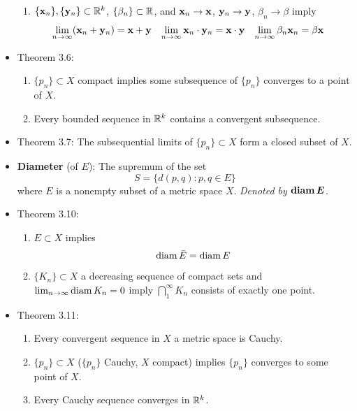 \documentclass[../../notes.tex]{subfiles}
\begin{document}
\begin{itemize}
\begin{enumerate}[label={(\alph*)}]
        \item $\{\mathbf{x}_n\},\{\mathbf{y}_n\}\subset\mathbb{R}^k$, $\{\beta_n\}\subset\mathbb{R}$, and $\mathbf{x}_n\to\mathbf{x}$, $\mathbf{y}_n\to\mathbf{y}$, $\beta_n\to\beta$ imply
        \begin{align*}
            \lim_{n\to\infty}(\mathbf{x}_n+\mathbf{y}_n) &= \mathbf{x}+\mathbf{y}&
            \lim_{n\to\infty}\mathbf{x}_n\cdot\mathbf{y}_n &= \mathbf{x}\cdot\mathbf{y}&
            \lim_{n\to\infty}\beta_n\mathbf{x}_n &= \beta\mathbf{x}
        \end{align*}
    \end{enumerate}
    \item Theorem 3.6:
    \begin{enumerate}[label={(\alph*)}]
        \item $\{p_n\}\subset X$ compact implies some subsequence of $\{p_n\}$ converges to a point of $X$.
        \item Every bounded sequence in $\mathbb{R}^k$ contains a convergent subsequence.
    \end{enumerate}
    \item Theorem 3.7: The subsequential limits of $\{p_n\}\subset X$ form a closed subset of $X$.
    \item \textbf{Diameter} (of $E$): The supremum of the set
    \begin{equation*}
        S = \{d(p,q):p,q\in E\}
    \end{equation*}
    where $E$ is a nonempty subset of a metric space $X$. \emph{Denoted by} $\bm{\diam E}$.
    \item Theorem 3.10:
    \begin{enumerate}[label={(\alph*)}]
        \item $E\subset X$ implies
        \begin{equation*}
            \operatorname{diam}\bar{E} = \operatorname{diam} E
        \end{equation*}
        \item $\{K_n\}\subset X$ a decreasing sequence of compact sets and $\lim_{n\to\infty}\operatorname{diam} K_n=0$ imply $\bigcap_1^\infty K_n$ consists of exactly one point.
    \end{enumerate}
    \item Theorem 3.11:
    \begin{enumerate}[label={(\alph*)}]
        \item Every convergent sequence in $X$ a metric space is Cauchy.
        \item $\{p_n\}\subset X$ ($\{p_n\}$ Cauchy, $X$ compact) implies $\{p_n\}$ converges to some point of $X$.
        \item Every Cauchy sequence converges in $\mathbb{R}^k$.

\end{enumerate}
\end{itemize}
\end{document}
